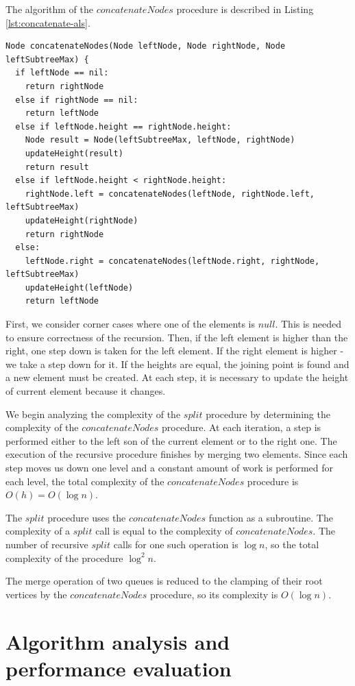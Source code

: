 \documentclass[conference]{IEEEtran}
\begin{document}
	The algorithm of the $concatenateNodes$ procedure is described in Listing \ref{lst:concatenate-als}.
	
		\begin{lstlisting}[caption={Merging two queues},label={lst:concatenate-als},captionpos=b]
Node concatenateNodes(Node leftNode, Node rightNode, Node leftSubtreeMax) {
  if leftNode == nil:
    return rightNode
  else if rightNode == nil:
    return leftNode
  else if leftNode.height == rightNode.height:
    Node result = Node(leftSubtreeMax, leftNode, rightNode)
    updateHeight(result)
    return result
  else if leftNode.height < rightNode.height:
    rightNode.left = concatenateNodes(leftNode, rightNode.left, leftSubtreeMax)
    updateHeight(rightNode)
    return rightNode
  else:
    leftNode.right = concatenateNodes(leftNode.right, rightNode, leftSubtreeMax)
    updateHeight(leftNode)
    return leftNode
		\end{lstlisting}

	First, we consider corner cases where one of the elements is $null$. This is needed to ensure correctness of the recursion. Then, if the left element is higher than the right, one step down is taken for the left element. If the right element is higher - we take a step down for it. If the heights are equal, the joining point is found and a new element must be created. At each step, it is necessary to update the height of current element because it changes.
	
	We begin analyzing the complexity of the $split$ procedure by determining the complexity of the $concatenateNodes$ procedure. At each iteration, a step is performed either to the left son of the current element or to the right one. The execution of the recursive procedure finishes by merging two elements. Since each step moves us down one level and a constant amount of work is performed for each level, the total complexity of the $concatenateNodes$ procedure is $O(h)=O(\log n)$.
	
	The $split$ procedure uses the $concatenateNodes$ function as a subroutine. The complexity of a $split$ call is equal to the complexity of $concatenateNodes$. The number of recursive $split$ calls for one such operation is $\log n$, so the total complexity of the procedure $\log^2 n$.
	
	The merge operation of two queues is reduced to the clamping of their root vertices by the $concatenateNodes$ procedure, so its complexity is $O(\log n)$.

\section{Algorithm analysis and performance evaluation}
\label{sec:algorithm-analysis-and-performance-evaluation}
\end{document}
